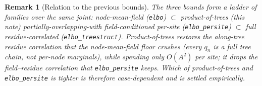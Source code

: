 \documentclass[11pt]{article}
\newtheorem{remark}{Remark}
\begin{document}
\begin{remark}[Relation to the previous bounds]
The three bounds form a ladder of families over the same joint:
node-mean-field (\texttt{elbo}) $\subset$ product-of-trees (this note)
partially-overlapping-with field-conditioned per-site
(\texttt{elbo\_persite}) $\subset$ full residue-correlated
(\texttt{elbo\_treestruct}). Product-of-trees restores the \emph{along-tree}
residue correlation that the node-mean-field floor crushes (every $q_n$ is a
full tree chain, not per-node marginals), while spending only $O(A^2)$ per
site; it drops the \emph{field--residue} correlation that
\texttt{elbo\_persite} keeps. Which of product-of-trees and
\texttt{elbo\_persite} is tighter is therefore case-dependent and is settled
empirically.
\end{remark}
\end{document}
